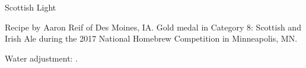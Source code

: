 \begin{recipe}{Scottish Light} %

\begin{aboutblock}
Recipe by Aaron Reif of Des Moines, IA. Gold medal in Category 8: Scottish and
Irish Ale during the 2017 National Homebrew Competition in Minneapolis, MN.
\sourceaha
\end{aboutblock}


\begin{methodandtiming}

\begin{mashsteps}
\end{mashsteps}

\begin{fermentationsteps}
\end{fermentationsteps}

\begin{directions}
Water adjustment: .
\end{directions}

\end{methodandtiming}

\recipebreak

\begin{ingredientsblock}

\begin{malts}
\end{malts}

\begin{hops}
\end{hops}


\end{ingredientsblock}

\end{recipe}


